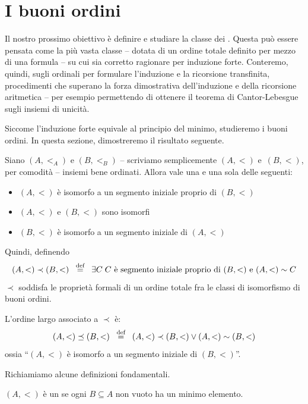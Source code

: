 \section{I buoni ordini}
Il nostro prossimo obiettivo \`e definire e studiare la classe dei . Questa pu\`o essere pensata come la pi\`u vasta classe
-- dotata di un ordine totale definito per mezzo di una formula -- su cui sia corretto ragionare per induzione forte. Conteremo, quindi, sugli ordinali per formulare 
l'induzione e la ricorsione transfinita, procedimenti che superano la forza dimostrativa dell'induzione e della ricorsione aritmetica -- per esempio permettendo di ottenere 
il teorema di Cantor-Lebesgue sugli insiemi di unicit\`a.

Siccome l'induzione forte equivale al principio del minimo, studieremo i buoni ordini. In questa sezione, dimostreremo il risultato seguente.

\begin{theorem}
	Siano $(A,<_A)$ e $(B,<_B)$ {\drkgrn -- scriviamo semplicemente $(A,<)$
e~$(B,<)$, per comodit\`a --} insiemi bene ordinati. Allora vale una e una
sola delle seguenti:
	\begin{itemize}
		\item $(A,<)$ \`e isomorfo a un segmento iniziale proprio di $(B,<)$
		\item $(A,<)$ e $(B,<)$ sono isomorfi
		\item $(B,<)$ \`e isomorfo a un segmento iniziale di $(A,<)$
	\end{itemize}

Quindi, definendo
\[ (A,<) \prec (B,<) \;\;\overset{\text{def}}{=}\;\; \exists C \; \text{$C$ \`e segmento
iniziale proprio di $(B,<)$ e $(A,<) \sim C$}
	\]
$\prec$ soddisfa le propriet\`a formali di un ordine totale fra le classi di isomorfismo di buoni ordini.
\end{theorem}

\begin{remark}
L'ordine largo associato a $\prec$ \`e:
\[ (A,<) \preceq (B,<) \;\;\overset{\text{def}}{=}\;\; (A,<) \prec (B,<) \lor (A,<) \sim (B,<)
	\]
ossia ``$(A,<)$ \`e isomorfo a un segmento iniziale di $(B,<)$''.
\end{remark}

Richiamiamo alcune definizioni fondamentali.

\begin{definition}
	$(A,<)$ \`e un  se ogni $B \subseteq A$ non vuoto ha un minimo elemento.
\end{definition}

